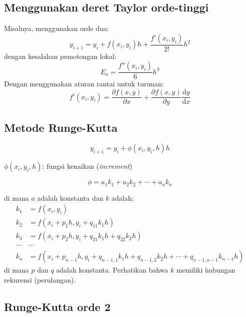 \subsection*{Menggunakan deret Taylor orde-tinggi}

Misalnya, menggunakan orde dua:
\begin{equation*}
y_{i+1} = y_{i} + f(x_i, y_i)h + \frac{f'(x_i, y_i)}{2!}h^2
\end{equation*}
dengan kesalahan pemotongan lokal:
\begin{equation*}
E_{a} = \frac{f''(x_i, y_i)}{6} h^3
\end{equation*}
Dengan menggunakan aturan rantai untuk turunan:
\begin{equation*}
f'(x_i, y_i) = \frac{\partial f(x,y)}{\partial x} +
\frac{\partial f(x,y)}{\partial y}\frac{\mathrm{d}y}{\mathrm{d}x}
\end{equation*}


\subsection*{Metode Runge-Kutta}

\begin{equation*}
y_{i+1} = y_{i} + \phi(x_i, y_i, h) h
\end{equation*}

$\phi(x_i, y_i, h)$: fungsi kenaikan (\textit{increment})

\begin{equation*}
\phi = a_1 k_1 + a_2 k_2 + \cdots + a_n k_n
\end{equation*}

di mana $a$ adalah konstanta dan $k$ adalah:
\begin{align*}
k_1 & = f(x_i, y_i) \\
k_2 & = f(x_i + p_1 h, y_i + q_{11} k_1 h ) \\
k_3 & = f(x_i + p_2 h, y_i + q_{21} k_1 h + q_{22} k_2 h) \\
\cdots & \cdots \\
k_n & = f(x_i + p_{n-1}h, y_i + q_{n-1,1} k_1 h + q_{n-1,2} k_2 h + \cdots + q_{n-1,n-1} k_{n-1} h)
\end{align*}
di mana $p$ dan $q$ adalah konstanta.
Perhatikan bahwa $k$ memiliki hubungan rekurensi (perulangan).


\subsection*{Runge-Kutta orde 2}


